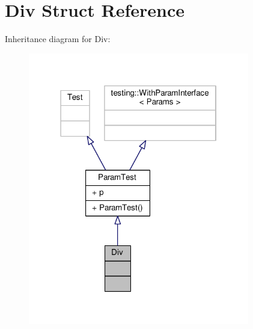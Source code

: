 \hypertarget{struct_div}{}\section{Div Struct Reference}
\label{struct_div}


Inheritance diagram for Div\+:
\nopagebreak
\begin{figure}[H]
\begin{center}
\leavevmode
\includegraphics[width=274pt]{struct_div__inherit__graph}
\end{center}
\end{figure}


